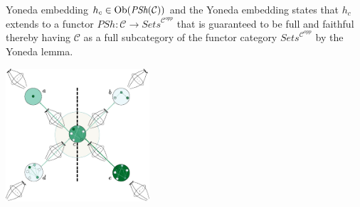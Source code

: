 \begin{frame}
\begin{block}{Yoneda embedding}
$h_c \in \mathop{\rm Ob}\nolimits(\textit{PSh}(\mathcal{C}))$ and the Yoneda embedding states that $h_c$ extends to a functor $PSh : \mathcal{C} \rightarrow \textit{Sets}^{\mathcal{C}^{opp}}$ that is guaranteed to be full and faithful thereby having $\mathcal{C}$ as a full subcategory of the functor category $\textit{Sets}^{\mathcal{C}^{opp}}$ by the Yoneda lemma.
\end{block}
\begin{block}{}
\centering\includegraphics[width=0.4\textwidth]{fig/infopres.pdf}
\end{block}
\end{frame}